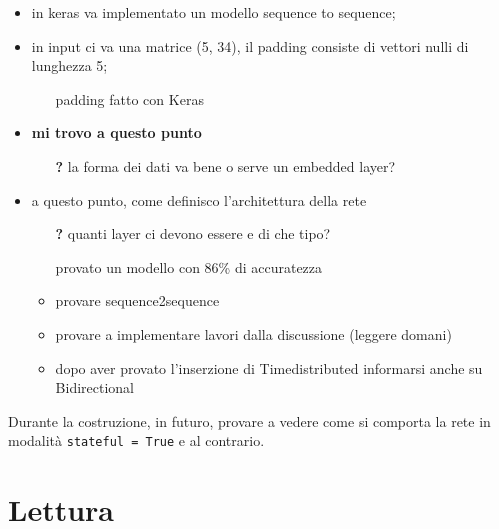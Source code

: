 \documentclass[twoside,twocolumn,11pt]{extarticle}
\theoremstyle{definition}
\begin{document}
	\begin{itemize}
		\item in keras va implementato un modello sequence to sequence;
		\item in input ci va una matrice (5, 34), il padding consiste di vettori nulli di lunghezza 5;
		\begin{itemize}
			\item[\textbf{\checkmark}] padding fatto con Keras
		\end{itemize}
		\item \textbf{mi trovo a questo punto}
		\begin{itemize}
			\item[\textbf{?}] la forma dei dati va bene o serve un embedded layer?
		\end{itemize}
		\item a questo punto, come definisco l'architettura della rete
		\begin{itemize}
			\item[\textbf{?}] quanti layer ci devono essere e di che tipo?
			\item[\checkmark] provato un modello con 86\% di accuratezza
			\item provare sequence2sequence
			\item provare a implementare lavori dalla discussione (leggere domani)
			\item dopo aver provato l'inserzione di Timedistributed informarsi anche su Bidirectional
		\end{itemize}
	\end{itemize}
	Durante la costruzione, in futuro, provare a vedere come si comporta la rete in modalità \texttt{stateful = True} e al contrario.

\section{Lettura \cite{bib:fenomeni-prosodici-prominenza}}
\end{document}
